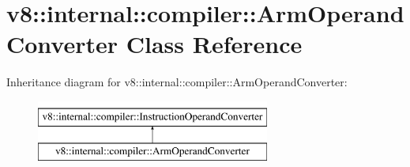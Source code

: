 \hypertarget{classv8_1_1internal_1_1compiler_1_1ArmOperandConverter}{}\section{v8\+:\+:internal\+:\+:compiler\+:\+:Arm\+Operand\+Converter Class Reference}
\label{classv8_1_1internal_1_1compiler_1_1ArmOperandConverter}
Inheritance diagram for v8\+:\+:internal\+:\+:compiler\+:\+:Arm\+Operand\+Converter\+:\begin{figure}[H]
\begin{center}
\leavevmode
\includegraphics[height=2.000000cm]{classv8_1_1internal_1_1compiler_1_1ArmOperandConverter}
\end{center}
\end{figure}
